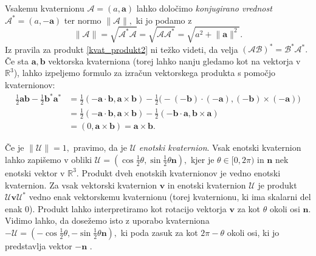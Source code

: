 \documentclass[12pt,a4paper,twoside]{article}
\theoremstyle{definition} %
\theoremstyle{plain} %
\theoremstyle{primerstyle}
\numberwithin{equation}{section}  %
\newcommand{\R}{\mathbb R}
\newcommand{\aV}{\mathbf{a}}
\newcommand{\bV}{\mathbf{b}}
\newcommand{\nV}{\mathbf{n}}
\newcommand{\vV}{\mathbf{v}}
\newcommand{\AQ}{\mathcal{A}}
\newcommand{\BQ}{\mathcal{B}}
\newcommand{\UQ}{\mathcal{U}}
\begin{document}
Vsakemu kvaternionu $\AQ=(a,\aV)$ lahko določimo \emph{konjugirano vrednost} $\AQ^*=(a,-\aV)$ ter normo $\lVert\AQ\rVert,$ ki jo podamo z
\begin{equation}
	\label{kvat_norma}
	\lVert\AQ\rVert=\sqrt{\AQ^*\AQ}=\sqrt{\AQ\AQ^*}=\sqrt{a^2+\lVert\aV\rVert^2}.
\end{equation}
Iz pravila za produkt \eqref{kvat_produkt2} ni težko videti, da velja $(\AQ\BQ)^*=\BQ^*\AQ^*.$ Če sta $\aV,\bV$ vektorska kvaterniona (torej lahko nanju gledamo kot na vektorja v $\R^3$), lahko izpeljemo formulo za izračun vektorskega produkta s pomočjo kvaternionov:
\begin{align}
	\frac{1}{2}\aV\bV-\frac{1}{2}\bV^*\aV^*&=\frac{1}{2}(-\aV\cdot\bV,\aV\times\bV)-\frac{1}{2}\big(-(-\bV)\cdot(-\aV),(-\bV)\times(-\aV)\big)\nonumber\\
	&=\frac{1}{2}(-\aV\cdot\bV,\aV\times\bV)-\frac{1}{2}(-\bV\cdot\aV,\bV\times\aV)\label{kvat_vekt_prod}\\
	&=(0,\aV\times\bV)=\aV\times\bV.\nonumber
\end{align}

Če je $\lVert\UQ\rVert=1,$ pravimo, da je $\UQ$ \emph{enotski kvaternion}. Vsak enotski kvaternion lahko zapišemo v obliki $\UQ=(\cos\frac{1}{2}\theta,\sin\frac{1}{2}\theta\nV),$ kjer je $\theta\in[0,2\pi)$ in $\nV$ nek enotski vektor v $\R^3.$ Produkt dveh enotskih kvaternionov je vedno enotski kvaternion. Za vsak vektorski kvaternion $\vV$ in enotski kvaternion $\UQ$ je produkt $\UQ\vV\UQ^*$ vedno enak vektorskemu kvaternionu (torej kvaternionu, ki ima skalarni del enak 0). Produkt lahko interpretiramo kot rotacijo vektorja $\vV$ za kot $\theta$ okoli osi $\nV.$ Vidimo lahko, da dosežemo isto z uporabo kvaterniona $-\UQ=(-\cos\frac{1}{2}\theta,-\sin\frac{1}{2}\theta\nV),$ ki poda zasuk za kot $2\pi-\theta$ okoli osi, ki jo predstavlja vektor $-\nV$ \cite[str. 387]{faroukietal2004}.
\end{document}

